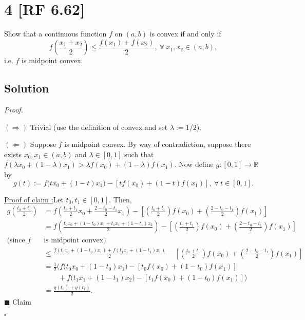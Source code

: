 \documentclass[12pt]{article}
\newcounter{ProofCounter}
\newcounter{ClaimCounter}[ProofCounter]
\newenvironment{Proof}{\stepcounter{ProofCounter}\textit{Proof.}}{\hfill$\square$}
\newenvironment{claim}[1]{\vspace{3mm}\stepcounter{ClaimCounter}\par\noindent\underline{\bf Claim \theClaimCounter:}\space#1}{}
\newenvironment{claimproof}[1]{\par\noindent\underline{Proof of claim \theClaimCounter:}\space#1}{\hfill $\blacksquare$ Claim \theClaimCounter}
\begin{document}
\newpage 
\section*{4 [RF 6.62]}
Show that a continuous function $f$ on $(a,b)$ is convex if and only if 
\[ f\left( \frac{x_{1} + x_{2}}{2} \right) \leq \frac{f(x_{1}) + f(x_{2})}{2}, \ \forall \ x_{1}, x_{2} \in (a,b), \]
i.e. $f$ is midpoint convex.

\subsection*{Solution}
\begin{Proof}

$(\Rightarrow)$ Trivial (use the definition of convex and set $\lambda := 1/2$).

$(\Leftarrow)$ Suppose $f$ is midpoint convex. By way of contradiction, suppose there exists $x_{0}, x_{1} \in (a,b)$ and $\lambda \in [0,1]$ such that 
$f(\lambda x_{0} + (1-\lambda)x_{1}) > \lambda f(x_{0}) + (1-\lambda)f(x_{1})$. Now define $g : [0,1] \rightarrow \mathbb{R}$ by 
\[ g(t) := f\big(tx_{0} + (1-t)x_{1}\big) - [t f(x_{0}) + (1-t)f(x_{1})], \ \forall \ t \in [0,1]. \]

\begin{claimproof}
Let $t_{0}, t_{1} \in [0,1]$. Then,
\begin{align*}
g\left( \frac{t_{0} + t_{1}}{2} \right) & = f\left( \frac{t_{0} + t_{1}}{2}x_{0} + \frac{2 - t_{0} - t_{1}}{2}x_{1} \right) - \left[ 
\left( \frac{t_{0} + t_{1}}{2} \right)f(x_{0}) + \left( \frac{2 - t_{0} - t_{1}}{2} \right)f(x_{1}) \right] \\
& = f\left( \frac{t_{0}x_{0} + (1-t_{0})x_{1} + t_{1}x_{1} + (1-t_{1})x_{2}}{2} \right) - \left[ \left( \frac{t_{0} + t_{1}}{2} \right)f(x_{0}) + 
\left( \frac{2 - t_{0} - t_{1}}{2} \right)f(x_{1}) \right] \\
\text{(since $f$ } & \text{is midpoint convex)} \\
& \leq \frac{f(t_{0}x_{0} + (1-t_{0})x_{1}) + f(t_{1}x_{1} + (1-t_{1})x_{1})}{2} - \left[ \left( \frac{t_{0} +
t_{1}}{2} \right)f(x_{0}) + 
\left( \frac{2 - t_{0} - t_{1}}{2} \right)f(x_{1}) \right] \\
& = \frac{1}{2}\bigg(f\big(t_{0}x_{0} + (1-t_{0})x_{1}\big) - [t_{0}f(x_{0}) + (1-t_{0})f(x_{1})] \\
& \qquad + f\big(t_{1}x_{1} + (1-t_{1})x_{2}\big) - [t_{1}f(x_{0}) +
(1-t_{0})f(x_{1})]\bigg) \\
& = \frac{g(t_{0}) + g(t_{1})}{2}.
\end{align*}
\end{claimproof}


\end{Proof}
\end{document}
